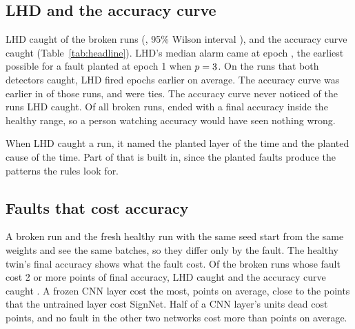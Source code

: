 \documentclass[11pt]{article}
\begin{document}
\subsection{LHD and the accuracy curve}
\label{sec:detection}

LHD caught \lhdCaught{} of the \lhdBrokenRuns{} broken runs (\lhdCaughtRate{}, 95\% Wilson interval \lhdCaughtInterval{}), and the accuracy curve caught \lhdAccCaught{} (Table~\ref{tab:headline}). LHD's median alarm came at epoch \lhdMedianEpoch{}, the earliest possible for a fault planted at epoch 1 when $p = 3$. On the \lhdBothCaught{} runs that both detectors caught, LHD fired \lhdBothGap{} epochs earlier on average. The accuracy curve was earlier in \lhdBothAccEarlier{} of those runs, and \lhdBothTies{} were ties. The accuracy curve never noticed \lhdAccNever{} of the runs LHD caught. Of all broken runs, \lhdSilentShare{} ended with a final accuracy inside the healthy range, so a person watching accuracy would have seen nothing wrong.

When LHD caught a run, it named the planted layer \lhdLayerRight{} of the time and the planted cause \lhdCauseRight{} of the time. Part of that is built in, since the planted faults produce the patterns the rules look for.

\begin{table}[t]
\centering
\small
\caption{LHD next to the accuracy curve on the planted frozen layers and dead units. The median epoch is over the runs each detector caught. Bold marks the better of the two where they differ.}
\label{tab:headline}

\end{table}

\subsection{Faults that cost accuracy}
\label{sec:harm}

A broken run and the fresh healthy run with the same seed start from the same weights and see the same batches, so they differ only by the fault. The healthy twin's final accuracy shows what the fault cost. Of the \lhdHarmBig{} broken runs whose fault cost 2 or more points of final accuracy, LHD caught \lhdHarmBigLHD{} and the accuracy curve caught \lhdHarmBigAcc{}. A frozen CNN layer cost the most, \lhdCnnFrozenDrop{} points on average, close to the \lhdStoryCost{} points that the untrained layer cost SignNet. Half of a CNN layer's units dead cost \lhdCnnHalfDeadDrop{} points, and no fault in the other two networks cost more than \lhdOtherMaxDrop{} points on average.
\end{document}
